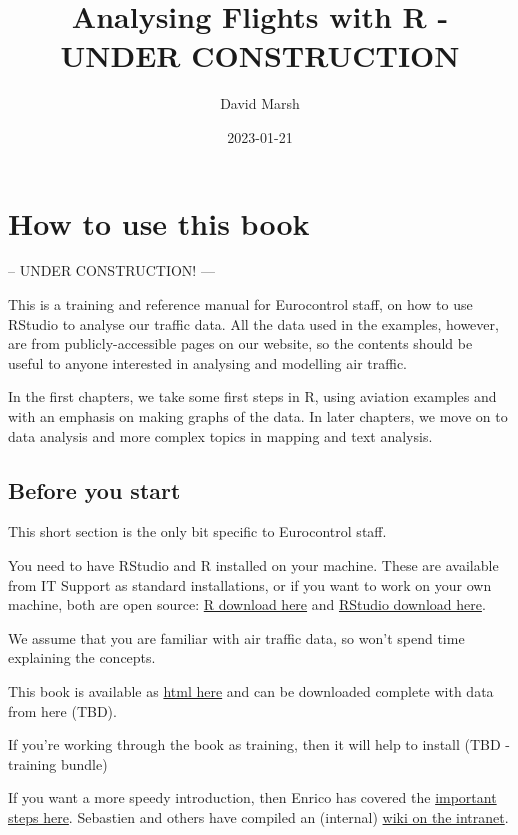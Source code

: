 \documentclass[
]{book}
\title{Analysing Flights with R - UNDER CONSTRUCTION}
\author{David Marsh}
\date{2023-01-21}
\begin{document}
\maketitle

{
\setcounter{tocdepth}{1}
\tableofcontents
}
\hypertarget{howto}{%
\chapter{How to use this book}\label{howto}}

-- UNDER CONSTRUCTION! ---

This is a training and reference manual for Eurocontrol staff, on how to use RStudio to analyse our traffic data. All the data used in the examples, however, are from publicly-accessible pages on our website, so the contents should be useful to anyone interested in analysing and modelling air traffic.

In the first chapters, we take some first steps in R, using aviation examples and with an emphasis on making graphs of the data. In later chapters, we move on to data analysis and more complex topics in mapping and text analysis.

\hypertarget{before-you-start}{%
\section{Before you start}\label{before-you-start}}

This short section is the only bit specific to Eurocontrol staff.

You need to have RStudio and R installed on your machine. These are available from IT Support as standard installations, or if you want to work on your own machine, both are open source: \href{https://cran.r-project.org}{R download here} and \href{https://rstudio.com/products/rstudio/download/}{RStudio download here}.

We assume that you are familiar with air traffic data, so won't spend time explaining the concepts.

This book is available as \href{https://david6marsh.github.io/flights_in_R/}{html here} and can be downloaded complete with data from here (TBD).

If you're working through the book as training, then it will help to install (TBD - training bundle)

If you want a more speedy introduction, then Enrico has covered the \href{https://github.com/euctrl-pru/portal/wiki/Intro-to-everything}{important steps here}. Sebastien and others have compiled an (internal) \href{https://ost.eurocontrol.int/sites/STATFO/WikiPages/R_documentation.aspx}{wiki on the intranet}.
\end{document}
